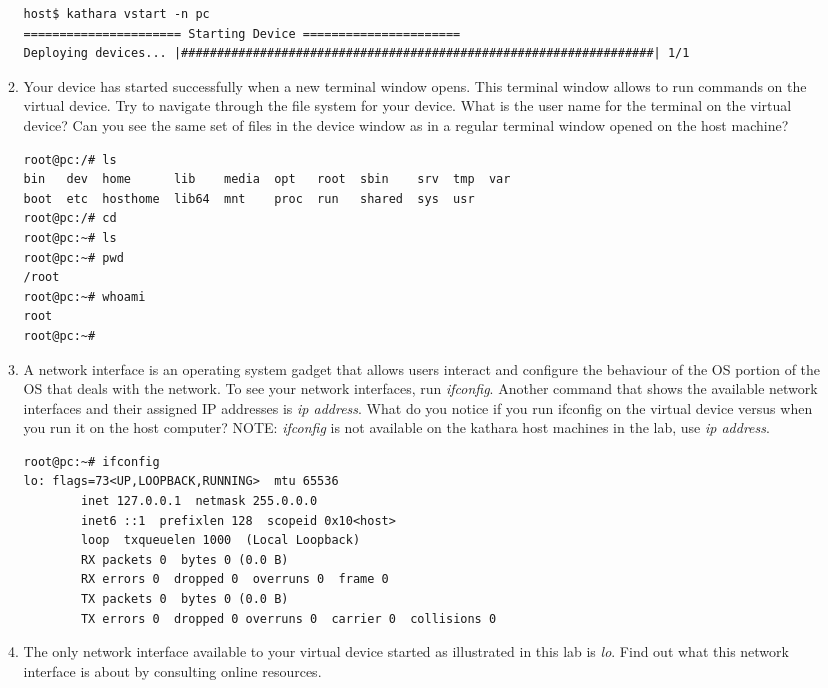 \documentclass[12pt]{book}
\begin{document}
\begin{enumerate}[label=\arabic*.]
\begin{enumerate}[label=Activity \arabic*:]
  \begin{lstlisting}
host$ kathara vstart -n pc
====================== Starting Device ======================
Deploying devices... |##################################################################| 1/1
\end{lstlisting}
  
\item Your device has started successfully when a new terminal window opens. This terminal window allows to run commands on the virtual device. Try to navigate through the file system for your device. What is the user name for the terminal on the virtual device? Can you see the same set of files in the device window as in a regular terminal window opened on the host machine?

\begin{lstlisting}
root@pc:/# ls
bin   dev  home      lib    media  opt   root  sbin    srv  tmp  var
boot  etc  hosthome  lib64  mnt    proc  run   shared  sys  usr
root@pc:/# cd 
root@pc:~# ls
root@pc:~# pwd
/root
root@pc:~# whoami
root
root@pc:~# 
\end{lstlisting}

\item A network interface is an operating system gadget that allows users interact and configure the behaviour of the OS portion of the OS that deals with the network. To see your network interfaces, run \emph{ifconfig}. Another command that shows the available network interfaces and their assigned IP addresses is \emph{ip address}. What do you notice if you run ifconfig on the virtual device versus when you run it on the host computer? NOTE: \emph{ifconfig} is not available on the kathara host machines in the lab, use \emph{ip address}.

\begin{lstlisting}
root@pc:~# ifconfig
lo: flags=73<UP,LOOPBACK,RUNNING>  mtu 65536
        inet 127.0.0.1  netmask 255.0.0.0
        inet6 ::1  prefixlen 128  scopeid 0x10<host>
        loop  txqueuelen 1000  (Local Loopback)
        RX packets 0  bytes 0 (0.0 B)
        RX errors 0  dropped 0  overruns 0  frame 0
        TX packets 0  bytes 0 (0.0 B)
        TX errors 0  dropped 0 overruns 0  carrier 0  collisions 0
\end{lstlisting}

\item The only network interface available to your virtual device started as illustrated in this lab is \emph{lo}. Find out what this network interface is about by consulting online resources.


\end{enumerate}
\end{enumerate}
\end{document}
